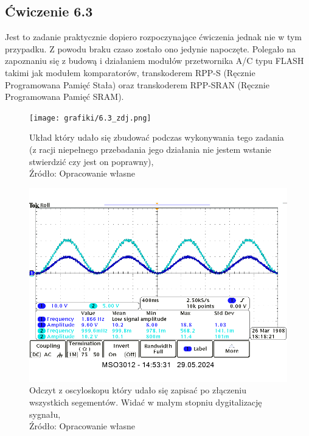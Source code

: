 \documentclass{article}
\begin{document}
    \subsection{Ćwiczenie 6.3}
      Jest to zadanie praktycznie dopiero rozpoczynające ćwiczenia jednak nie w tym przypadku. Z powodu braku czaso zostało ono jedynie napoczęte. Polegało na zapoznaniu się z budową i działaniem modułów przetwornika A/C typu FLASH takimi jak modułem komparatorów, transkoderem RPP-S (Ręcznie Programowana Pamięć Stała) oraz transkoderem RPP-SRAN (Ręcznie Programowana Pamięć SRAM).

      \begin{figure}[!ht]
        \begin{minipage}{.5\textwidth}
          \centering
          \texttt{[image: grafiki/6.3\_zdj.png]}
          \caption{Układ który udało się zbudować podczas wykonywania tego zadania (z racji niepełnego przebadania jego działania nie jestem wstanie stwierdzić czy jest on poprawny),
          \\Źródło: Opracowanie własne}
        \end{minipage}
        \begin{minipage}{.5\textwidth}
          \centering
          \includegraphics[scale=0.35]{grafiki/przetwornik_A_C.png}
          \caption{Odczyt z oscyloskopu który udało się zapisać po złączeniu wszystkich segementów. Widać w małym stopniu dygitalizację sygnału,
          \\Źródło: Opracowanie własne}
        \end{minipage}
      \end{figure}
\end{document}
